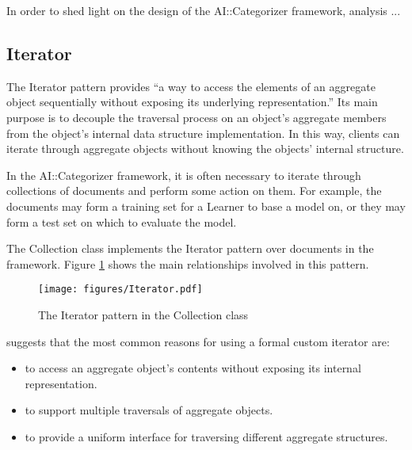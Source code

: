 \documentclass[a4paper]{report}
\begin{document}
In order to shed light on the design of the AI::Categorizer framework,
analysis ...


\subsection{Iterator}

The Iterator pattern provides ``a way to access the elements of an
aggregate object sequentially without exposing its underlying
representation.'' \cite[p. 257]{gamma:95} Its main purpose is to
decouple the traversal process on an object's aggregate members from
the object's internal data structure implementation.  In this way,
clients can iterate through aggregate objects without knowing the
objects' internal structure.

In the AI::Categorizer framework, it is often necessary to iterate
through collections of documents and perform some action on them.  For
example, the documents may form a training set for a Learner to base a
model on, or they may form a test set on which to evaluate the model.

The Collection class implements the Iterator pattern
\cite[p. 257]{gamma:95} over documents in the framework.  Figure
\ref{Iterator-collection} shows the main relationships involved in
this pattern.

\begin{figure}
\texttt{[image: figures/Iterator.pdf]}
\caption{The Iterator pattern in the Collection class}
\label{Iterator-collection}
\end{figure}


\cite[p. 259]{gamma:95} suggests that the most common reasons for
using a formal custom iterator are:

\begin{itemize}

\item to access an aggregate object's contents without exposing its
internal representation.

\item to support multiple traversals of aggregate objects.

\item to provide a uniform interface for traversing different
aggregate structures.

\end{itemize}
\end{document}
